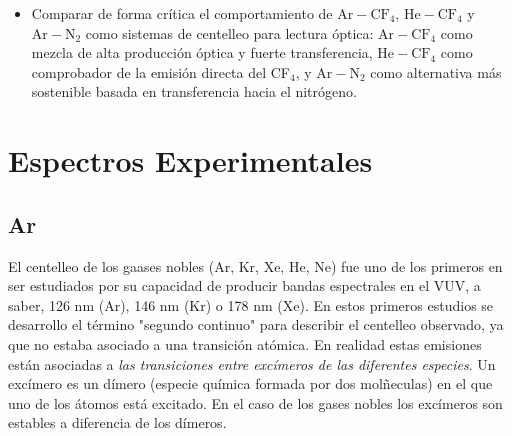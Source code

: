 \documentclass[12pt,a4paper]{article}
\newcommand{\N}{\mathrm{N}}
\newcommand{\He}{\mathrm{He}}
\newcommand{\Ar}{\mathrm{Ar}}
\newcommand{\CF}{\mathrm{CF}}
\begin{document}
\begin{itemize}
    \item Comparar de forma crítica el comportamiento de $\Ar-\CF_4$, $\He-\CF_4$ y $\Ar-\N_2$ como sistemas de centelleo para lectura óptica: $\Ar-\CF_4$ como mezcla de alta producción óptica y fuerte transferencia, $\He-\CF_4$ como comprobador de la emisión directa del CF$_4$, y $\Ar-\N_2$ como alternativa más sostenible basada en transferencia hacia el nitrógeno.

    
\end{itemize}

\section{Espectros Experimentales} \label{sec:experimental_espectra}

\subsection{Ar} \label{subsec:Ar_spectra}


El centelleo de los gaases nobles (Ar, Kr, Xe, He, Ne) fue uno de los primeros en ser estudiados por su capacidad de producir bandas espectrales en el VUV, a saber, 126 nm (Ar), 146 nm (Kr) o 178 nm (Xe). En estos primeros estudios se desarrollo el término "segundo continuo" para describir el centelleo observado, ya que no estaba asociado a una transición atómica. En realidad estas emisiones están asociadas a \textit{las transiciones entre excímeros de las diferentes especies}. Un excímero es un dímero (especie química formada por dos molñeculas) en el que uno de los átomos está excitado. En el caso de los gases nobles los excímeros son estables a diferencia de los dímeros. 
\end{document}
